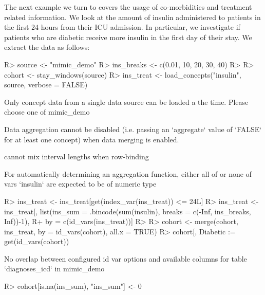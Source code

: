 \documentclass[
]{jss}
\begin{document}
The next example we turn to covers the usage of co-morbidities and
treatment related information. We look at the amount of insulin
administered to patients in the first 24 hours from their ICU admission.
In particular, we investigate if patients who are diabetic receive more
insulin in the first day of their stay. We extract the data as follows:

\begin{CodeChunk}

\begin{CodeInput}
R> source <- "mimic_demo"
R> ins_breaks <- c(0.01, 10, 20, 30, 40)
R> 
R> cohort <- stay_windows(source)
R> ins_treat <- load_concepts("insulin", source, verbose = FALSE)
\end{CodeInput}

\begin{CodeOutput}
Only concept data from a single data source can be loaded a the time. Please
choose one of mimic_demo
\end{CodeOutput}

\begin{CodeOutput}
Data aggregation cannot be disabled (i.e. passing an `aggregate` value of
`FALSE` for at least one concept) when data merging is enabled.
\end{CodeOutput}

\begin{CodeOutput}
cannot mix interval lengths when row-binding
\end{CodeOutput}

\begin{CodeOutput}
For automatically determining an aggregation function, either all of or none of
vars `insulin` are expected to be of numeric type
\end{CodeOutput}

\begin{CodeInput}
R> ins_treat <- ins_treat[get(index_var(ins_treat)) <= 24L]
R> ins_treat <- ins_treat[, list(ins_sum = .bincode(sum(insulin), breaks = c(-Inf, ins_breaks, Inf))-1),
R+   by = c(id_vars(ins_treat))]
R> 
R> cohort <- merge(cohort, ins_treat, by = id_vars(cohort), all.x = TRUE)
R> cohort[, Diabetic := get(id_vars(cohort)) %
\end{CodeInput}

\begin{CodeOutput}
No overlap between configured id var options and available columns for table
`diagnoses_icd` in mimic_demo
\end{CodeOutput}

\begin{CodeInput}
R> cohort[is.na(ins_sum), "ins_sum"] <- 0
\end{CodeInput}
\end{CodeChunk}
\end{document}
